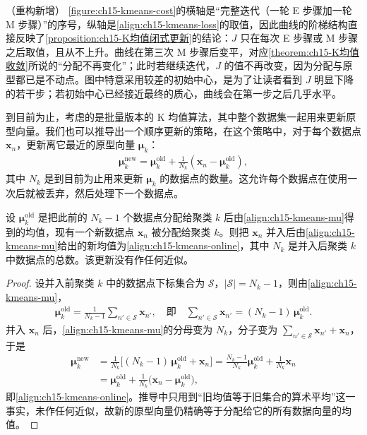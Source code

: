\documentclass[../../main.tex]{subfiles}
\begin{document}
\begin{remark}（重构新增）
\cref{figure:ch15-kmeans-cost}的横轴是“完整迭代（一轮 E 步骤加一轮 M 步骤）”的序号，纵轴是\eqref{align:ch15-kmeans-loss}的取值，因此曲线的阶梯结构直接反映了\cref{proposition:ch15-K均值闭式更新}的结论：$J$ 只在每次 E 步骤或 M 步骤之后取值，且从不上升。曲线在第三次 M 步骤后变平，对应\cref{theorem:ch15-K均值收敛}所说的“分配不再变化”；此时若继续迭代，$J$ 的值不再改变，因为分配与原型都已是不动点。图中特意采用较差的初始中心，是为了让读者看到 $J$ 明显下降的若干步；若初始中心已经接近最终的质心，曲线会在第一步之后几乎水平。
\end{remark}

到目前为止，考虑的是批量版本的 K 均值算法，其中整个数据集一起用来更新原型向量。我们也可以推导出一个顺序更新的策略，在这个策略中，对于每个数据点 $\bm{x}_n$，更新离它最近的原型向量 $\bm{\mu}_k$：
\begin{align}
\bm{\mu}_k^{\text{new}}=\bm{\mu}_k^{\text{old}}+\frac{1}{N_k}(\bm{x}_n-\bm{\mu}_k^{\text{old}}),
\label{align:ch15-kmeans-online}
\end{align}
其中 $N_k$ 是到目前为止用来更新 $\bm{\mu}_k$ 的数据点的数量。这允许每个数据点在使用一次后就被丢弃，然后处理下一个数据点。

\begin{proposition}[顺序 K 均值更新]\label{proposition:ch15-顺序K均值}
设 $\bm{\mu}_k^{\text{old}}$ 是把此前的 $N_k-1$ 个数据点分配给聚类 $k$ 后由\eqref{align:ch15-kmeans-mu}得到的均值，现有一个新数据点 $\bm{x}_n$ 被分配给聚类 $k$。则把 $\bm{x}_n$ 并入后由\eqref{align:ch15-kmeans-mu}给出的新均值为\eqref{align:ch15-kmeans-online}，其中 $N_k$ 是并入后聚类 $k$ 中数据点的总数。该更新没有作任何近似。
\end{proposition}
\begin{proof}
设并入前聚类 $k$ 中的数据点下标集合为 $\mathcal{S}$，$|\mathcal{S}|=N_k-1$，则由\eqref{align:ch15-kmeans-mu}，
\begin{align*}
\bm{\mu}_k^{\text{old}}=\frac{1}{N_k-1}\sum_{n'\in\mathcal{S}}\bm{x}_{n'},
\quad\text{即}\quad
\sum_{n'\in\mathcal{S}}\bm{x}_{n'}=(N_k-1)\,\bm{\mu}_k^{\text{old}}.
\end{align*}
并入 $\bm{x}_n$ 后，\eqref{align:ch15-kmeans-mu}的分母变为 $N_k$，分子变为 $\sum_{n'\in\mathcal{S}}\bm{x}_{n'}+\bm{x}_n$，于是
\begin{align*}
\bm{\mu}_k^{\text{new}}
&=\frac{1}{N_k}\Big[(N_k-1)\,\bm{\mu}_k^{\text{old}}+\bm{x}_n\Big]
=\frac{N_k-1}{N_k}\bm{\mu}_k^{\text{old}}+\frac{1}{N_k}\bm{x}_n\\
&=\bm{\mu}_k^{\text{old}}+\frac{1}{N_k}\big(\bm{x}_n-\bm{\mu}_k^{\text{old}}\big),
\end{align*}
即\eqref{align:ch15-kmeans-online}。推导中只用到“旧均值等于旧集合的算术平均”这一事实，未作任何近似，故新的原型向量仍精确等于分配给它的所有数据向量的均值。
\end{proof}
\end{document}
